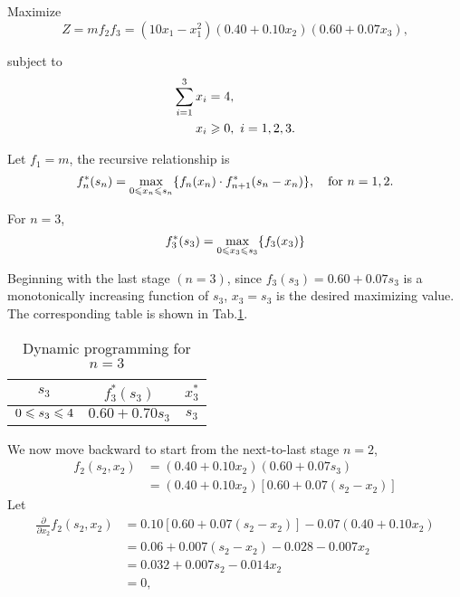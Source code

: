 \documentclass[a4paper]{article}
\begin{document}
\begin{enumerate}
\begin{solution}
	Maximize $$Z=mf_2f_3=(10x_1-x_1^2)(0.40+0.10x_2)(0.60+0.07x_3),$$
	
	subject to
	\begin{equation*}
		\begin{aligned}
			\sum_{i=1}^3x_i&=4,\\		
			x_i&\geqslant0,\ i=1,2,3.
		\end{aligned}
	\end{equation*}
	
	Let $f_1=m$, the recursive relationship is
	\begin{equation*}	
		f_n^*(s_n)=\max\limits_{0\leqslant x_n\leqslant s_n}\{f_n(x_n) \cdot f_{n+1}^*(s_n-x_n)\},
		\quad \text{for } n=1,2.
	\end{equation*}
	
	For $n=3$,
	\begin{equation*}
		f_3^*(s_3)=\max\limits_{0\leqslant x_3\leqslant s_3}\{f_3(x_3)\}
	\end{equation*}
	
	Beginning with the last stage $(n=3)$, since $f_3(s_3)=0.60+0.07s_3$ is a monotonically increasing function of $s_3$, $x_3=s_3$ is the desired maximizing value. The corresponding table is shown in Tab.\ref{tab2n3}.
	\begin{table}[h]
	  	\centering
	  	\caption{Dynamic programming for $n=3$}
	  	\label{tab2n3}
	  	\begin{tabular}{ccc}
	  		\toprule[1.5pt]
	  		$s_3$&$f_3^*(s_3)$&$x_3^*$\\
	  		\midrule
			$0\leqslant s_3\leqslant4$&$0.60+0.70s_3$&$s_3$\\
	  		\bottomrule[1.5pt]
	  	\end{tabular}
  	\end{table}
  	
	We now move backward to start from the next-to-last stage $n=2$,
	\begin{equation*}
	\begin{aligned}
		f_2(s_2,x_2)&=(0.40+0.10x_2)(0.60+0.07s_3)\\
					    &=(0.40+0.10x_2)[0.60+0.07(s_2-x_2)]
		\end{aligned}
	\end{equation*}
	Let
	\begin{equation*}
	\begin{aligned}
		\frac{\partial}{\partial x_2}f_2(s_2,x_2)
		&=0.10[0.60+0.07(s_2-x_2)]-0.07(0.40+0.10x_2)\\
		&=0.06+0.007(s_2-x_2)-0.028-0.007x_2\\
		&=0.032+0.007s_2-0.014x_2\\
		&=0,\\
		\end{aligned}
	\end{equation*}
	

\end{solution}
\end{enumerate}
\end{document}
